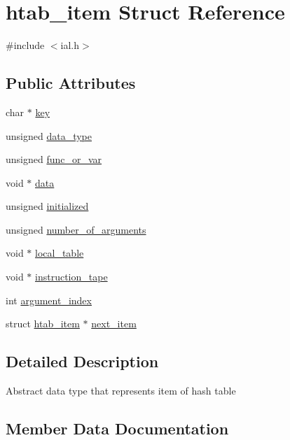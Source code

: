 \hypertarget{structhtab__item}{}\section{htab\+\_\+item Struct Reference}
\label{structhtab__item}


{\ttfamily \#include $<$ial.\+h$>$}

\subsection*{Public Attributes}
\begin{DoxyCompactItemize}
\item 
char $\ast$ \hyperlink{structhtab__item_a66b265819081d3527ad1941f8bcb09d6}{key}
\item 
unsigned \hyperlink{structhtab__item_a884c03e9b59149a95829a71901276a8b}{data\+\_\+type}
\item 
unsigned \hyperlink{structhtab__item_a646c1a75cab8e90247c082d080782803}{func\+\_\+or\+\_\+var}
\item 
void $\ast$ \hyperlink{structhtab__item_aa1b7ec267e7ba427e04f1c2f36fd12b6}{data}
\item 
unsigned \hyperlink{structhtab__item_a7a297ff53beac4e5bd00982369fee710}{initialized}
\item 
unsigned \hyperlink{structhtab__item_a3f6b7b1fb06bd1a500375bd68a26685d}{number\+\_\+of\+\_\+arguments}
\item 
void $\ast$ \hyperlink{structhtab__item_ab925f22b6d466d9d5c6e3099b79dfb58}{local\+\_\+table}
\item 
void $\ast$ \hyperlink{structhtab__item_a88ce186940697b2875ed88bdaca2db12}{instruction\+\_\+tape}
\item 
int \hyperlink{structhtab__item_a890983537face39050d82ef9087c12ff}{argument\+\_\+index}
\item 
struct \hyperlink{structhtab__item}{htab\+\_\+item} $\ast$ \hyperlink{structhtab__item_a8fe0d8f000c284334b0d939982239030}{next\+\_\+item}
\end{DoxyCompactItemize}


\subsection{Detailed Description}
Abstract data type that represents item of hash table 

\subsection{Member Data Documentation}
\hypertarget{structhtab__item_a890983537face39050d82ef9087c12ff}{}
